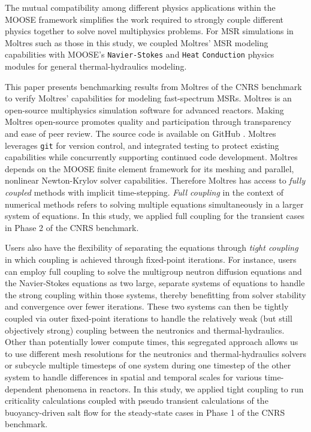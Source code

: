 The mutual compatibility among different physics applications within the
\gls{MOOSE} framework simplifies the work required to strongly couple
different physics together to solve novel multiphysics problems. For \gls{MSR}
simulations in Moltres such as those in this study, we coupled Moltres'
\gls{MSR} modeling capabilities with \gls{MOOSE}'s \texttt{Navier-Stokes} and
\texttt{Heat} \texttt{Conduction} physics modules \cite{peterson_overview_2018}
for general thermal-hydraulics modeling.

This paper presents benchmarking results from Moltres of the CNRS benchmark
to verify Moltres' capabilities for modeling fast-spectrum \glspl{MSR}. Moltres
is an open-source multiphysics simulation software for advanced reactors.
Making Moltres open-source promotes quality and participation through
transparency and ease of peer review. The source code
\cite{lindsay_moltres_2017} is available on GitHub \cite{github_build_2017}.
Moltres leverages \texttt{git} for version control, and integrated testing to
protect existing capabilities while concurrently supporting continued code
development. Moltres depends on the \gls{MOOSE} finite element framework for
its meshing and parallel, nonlinear Newton-Krylov solver capabilities.
Therefore Moltres has access to \textit{fully coupled} methods with implicit
time-stepping. \textit{Full coupling} in the context of numerical methods
refers to solving multiple equations simultaneously in a larger system of
equations. In this study, we applied full coupling for the transient
cases in Phase 2 of the CNRS benchmark.

Users also have the flexibility of separating the equations through
\textit{tight coupling} in which coupling is achieved through
fixed-point iterations. For instance, users can employ full coupling to solve
the multigroup neutron diffusion equations and the Navier-Stokes equations as
two large, separate systems of equations to handle the strong coupling within
those systems, thereby benefitting from solver stability and convergence
over fewer iterations. These two systems can then be tightly coupled via outer
fixed-point iterations to handle the relatively weak (but still objectively
strong) coupling between the neutronics and thermal-hydraulics. Other than
potentially lower compute times, this segregated approach allows us to use
different mesh resolutions for the neutronics and thermal-hydraulics solvers
or subcycle multiple timesteps of one system during one timestep of the other
system to handle differences in spatial and temporal scales for various
time-dependent phenomena in reactors. In this study, we applied tight coupling
to run criticality calculations coupled with pseudo transient calculations of
the buoyancy-driven salt flow for the steady-state cases in Phase 1 of the CNRS
benchmark.

